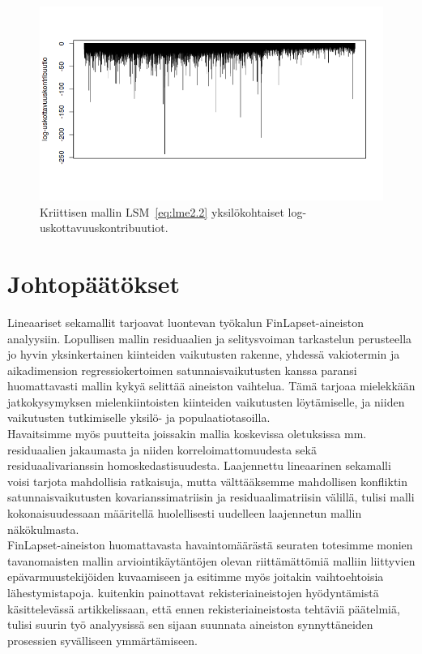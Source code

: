 \documentclass[finnish]{docopts}
\begin{document}
\begin{figure}[H]
\centering
  \includegraphics[scale=0.8]{kuvaajat/log.png}
  \caption{Kriittisen mallin $\text{LSM}$~\ref{eq:lme2.2} yksilökohtaiset log-uskottavuuskontribuutiot.}
  \label{fig:logkontrib}
\end{figure}

\section{Johtopäätökset}

Lineaariset sekamallit tarjoavat luontevan työkalun FinLapset-aineiston analyysiin. Lopullisen mallin residuaalien ja selitysvoiman tarkastelun perusteella jo hyvin yksinkertainen kiinteiden vaikutusten rakenne, yhdessä vakiotermin ja aikadimension regressiokertoimen satunnaisvaikutusten kanssa paransi huomattavasti mallin kykyä selittää aineiston vaihtelua. Tämä tarjoaa mielekkään jatkokysymyksen mielenkiintoisten kiinteiden vaikutusten löytämiselle, ja niiden vaikutusten tutkimiselle yksilö- ja populaatiotasoilla.\\

Havaitsimme myös puutteita joissakin mallia koskevissa oletuksissa mm. residuaalien jakaumasta ja niiden korreloimattomuudesta sekä residuaalivarianssin homoskedastisuudesta. Laajennettu lineaarinen sekamalli voisi tarjota mahdollisia ratkaisuja, mutta välttääksemme mahdollisen konfliktin satunnaisvaikutusten kovarianssimatriisin ja residuaalimatriisin välillä, tulisi malli kokonaisuudessaan määritellä huolellisesti uudelleen laajennetun mallin näkökulmasta.\\

FinLapset-aineiston huomattavasta havaintomäärästä seuraten totesimme monien tavanomaisten mallin arviointikäytäntöjen olevan riittämättömiä malliin liittyvien epävarmuustekijöiden kuvaamiseen ja esitimme myös joitakin vaihtoehtoisia lähestymistapoja. \cite{connelly2016} kuitenkin painottavat rekisteriaineistojen hyödyntämistä käsittelevässä artikkelissaan, että ennen rekisteriaineistosta tehtäviä päätelmiä, tulisi suurin työ analyysissä sen sijaan suunnata aineiston synnyttäneiden prosessien syvälliseen ymmärtämiseen.\\
\end{document}
